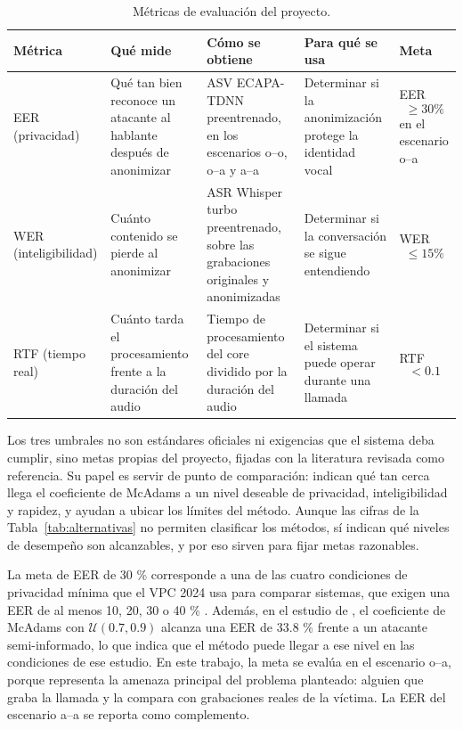 \documentclass[10pt,twocolumn]{article}
\newcommand{\textcite}[1]{\citet{#1}}
\newcommand{\parencite}[1]{\citep{#1}}
\begin{document}
\begin{table}[!t]
\centering
\caption{Métricas de evaluación del proyecto.}
\label{tab:metricas}
\footnotesize
\renewcommand{\arraystretch}{1.16}
\setlength{\tabcolsep}{4pt}
\begin{tabularx}{\textwidth}{>{\raggedright\arraybackslash}p{2.45cm}>{\raggedright\arraybackslash}p{2.9cm}>{\raggedright\arraybackslash}X>{\raggedright\arraybackslash}p{3.05cm}>{\raggedright\arraybackslash}p{1.45cm}}
\toprule
\textbf{Métrica} & \textbf{Qué mide} & \textbf{Cómo se obtiene} & \textbf{Para qué se usa} & \textbf{Meta} \\
\midrule
EER (privacidad) & Qué tan bien reconoce un atacante al hablante después de anonimizar & ASV ECAPA-TDNN preentrenado, en los escenarios o--o, o--a y a--a & Determinar si la anonimización protege la identidad vocal & EER$$\ge30\%$$  en el escenario o--a \\
\addlinespace[2pt]
WER (inteligibilidad) & Cuánto contenido se pierde al anonimizar & ASR Whisper turbo preentrenado, sobre las grabaciones originales y anonimizadas & Determinar si la conversación se sigue entendiendo & WER $$\leq 15 \% $$\\
\addlinespace[2pt]
RTF (tiempo real) & Cuánto tarda el procesamiento frente a la duración del audio & Tiempo de procesamiento del core dividido por la duración del audio & Determinar si el sistema puede operar durante una llamada & RTF $$< 0.1$$ \\
\bottomrule
\end{tabularx}
\end{table}

Los tres umbrales no son estándares oficiales ni exigencias que el sistema deba cumplir, sino metas propias del proyecto, fijadas con la literatura revisada como referencia. Su papel es servir de punto de comparación: indican qué tan cerca llega el coeficiente de McAdams a un nivel deseable de privacidad, inteligibilidad y rapidez, y ayudan a ubicar los límites del método. Aunque las cifras de la Tabla~\ref{tab:alternativas} no permiten clasificar los métodos, sí indican qué niveles de desempeño son alcanzables, y por eso sirven para fijar metas razonables.

La meta de EER de 30 \% corresponde a una de las cuatro condiciones de privacidad mínima que el VPC 2024 usa para comparar sistemas, que exigen una EER de al menos 10, 20, 30 o 40 \% \parencite{tomashenko2024}. Además, en el estudio de \textcite{patino2021}, el coeficiente de McAdams con $\mathcal{U}(0.7,0.9)$ alcanza una EER de 33.8 \% frente a un atacante semi-informado, lo que indica que el método puede llegar a ese nivel en las condiciones de ese estudio. En este trabajo, la meta se evalúa en el escenario o--a, porque representa la amenaza principal del problema planteado: alguien que graba la llamada y la compara con grabaciones reales de la víctima. La EER del escenario a--a se reporta como complemento.
\end{document}
